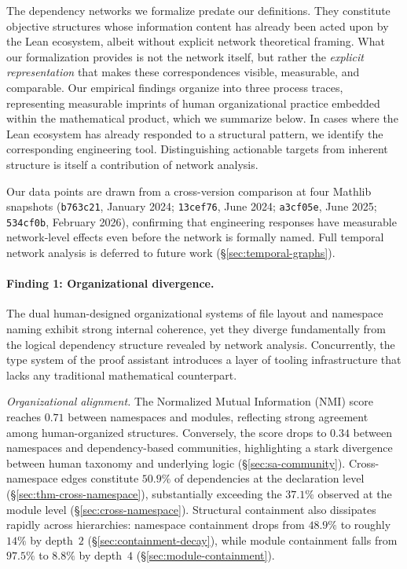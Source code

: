 The dependency networks we formalize predate our definitions. They constitute objective structures whose information content has already been acted upon by the Lean ecosystem, albeit without explicit network theoretical framing. What our formalization provides is not the network itself, but rather the \emph{explicit representation} that makes these correspondences visible, measurable, and comparable. Our empirical findings organize into three process traces, representing measurable imprints of human organizational practice embedded within the mathematical product, which we summarize below. In cases where the Lean ecosystem has already responded to a structural pattern, we identify the corresponding engineering tool. Distinguishing actionable targets from inherent structure is itself a contribution of network analysis.

Our data points are drawn from a cross-version comparison at four Mathlib snapshots (\texttt{b763c21}, January 2024; \texttt{13cef76}, June 2024; \texttt{a3cf05e}, June 2025; \texttt{534cf0b}, February 2026), confirming that engineering responses have measurable network-level effects even before the network is formally named. Full temporal network analysis is deferred to future work (\S\ref{sec:temporal-graphs}). 

\paragraph{Finding 1: Organizational divergence.}
The dual human-designed organizational systems of file layout and namespace naming exhibit strong internal coherence, yet they diverge fundamentally from the logical dependency structure revealed by network analysis. Concurrently, the type system of the proof assistant introduces a layer of tooling infrastructure that lacks any traditional mathematical counterpart.

\emph{Organizational alignment.}
The Normalized Mutual Information (NMI) score reaches $0.71$ between namespaces and modules, reflecting strong agreement among human-organized structures. Conversely, the score drops to $0.34$ between namespaces and dependency-based communities, highlighting a stark divergence between human taxonomy and underlying logic (\S\ref{sec:sa-community}). Cross-namespace edges constitute $50.9\%$ of dependencies at the declaration level (\S\ref{sec:thm-cross-namespace}), substantially exceeding the $37.1\%$ observed at the module level (\S\ref{sec:cross-namespace}). Structural containment also dissipates rapidly across hierarchies: namespace containment drops from $48.9\%$ to roughly $14\%$ by depth~$2$ (\S\ref{sec:containment-decay}), while module containment falls from $97.5\%$ to $8.8\%$ by depth~$4$ (\S\ref{sec:module-containment}).

